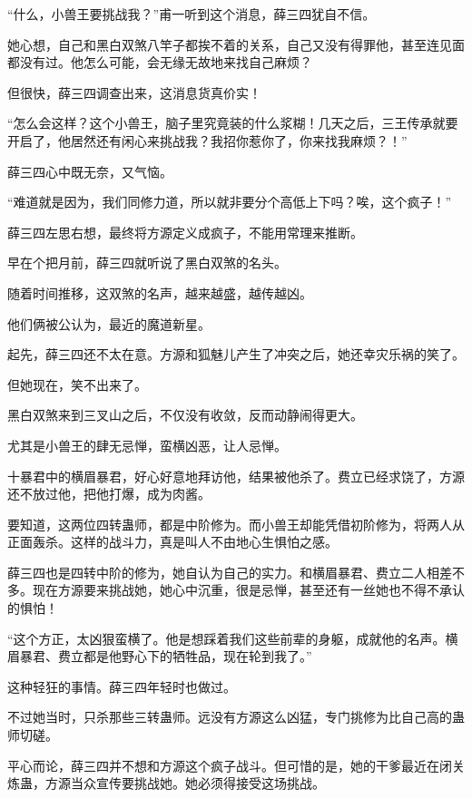 
\begin{this_body}

“什么，小兽王要挑战我？”甫一听到这个消息，薛三四犹自不信。

她心想，自己和黑白双煞八竿子都挨不着的关系，自己又没有得罪他，甚至连见面都没有过。他怎么可能，会无缘无故地来找自己麻烦？

但很快，薛三四调查出来，这消息货真价实！

“怎么会这样？这个小兽王，脑子里究竟装的什么浆糊！几天之后，三王传承就要开启了，他居然还有闲心来挑战我？我招你惹你了，你来找我麻烦？！”

薛三四心中既无奈，又气恼。

“难道就是因为，我们同修力道，所以就非要分个高低上下吗？唉，这个疯子！”

薛三四左思右想，最终将方源定义成疯子，不能用常理来推断。

早在个把月前，薛三四就听说了黑白双煞的名头。

随着时间推移，这双煞的名声，越来越盛，越传越凶。

他们俩被公认为，最近的魔道新星。

起先，薛三四还不太在意。方源和狐魅儿产生了冲突之后，她还幸灾乐祸的笑了。

但她现在，笑不出来了。

黑白双煞来到三叉山之后，不仅没有收敛，反而动静闹得更大。

尤其是小兽王的肆无忌惮，蛮横凶恶，让人忌惮。

十暴君中的横眉暴君，好心好意地拜访他，结果被他杀了。费立已经求饶了，方源还不放过他，把他打爆，成为肉酱。

要知道，这两位四转蛊师，都是中阶修为。而小兽王却能凭借初阶修为，将两人从正面轰杀。这样的战斗力，真是叫人不由地心生惧怕之感。

薛三四也是四转中阶的修为，她自认为自己的实力。和横眉暴君、费立二人相差不多。现在方源要来挑战她，她心中沉重，很是忌惮，甚至还有一丝她也不得不承认的惧怕！

“这个方正，太凶狠蛮横了。他是想踩着我们这些前辈的身躯，成就他的名声。横眉暴君、费立都是他野心下的牺牲品，现在轮到我了。”

这种轻狂的事情。薛三四年轻时也做过。

不过她当时，只杀那些三转蛊师。远没有方源这么凶猛，专门挑修为比自己高的蛊师切磋。

平心而论，薛三四并不想和方源这个疯子战斗。但可惜的是，她的干爹最近在闭关炼蛊，方源当众宣传要挑战她。她必须得接受这场挑战。


\end{this_body}
